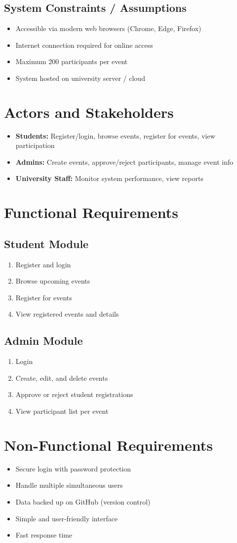 \documentclass[12pt,a4paper]{article}
\begin{document}
\subsection{System Constraints / Assumptions}
\begin{itemize}
    \item Accessible via modern web browsers (Chrome, Edge, Firefox)
    \item Internet connection required for online access
    \item Maximum 200 participants per event
    \item System hosted on university server / cloud
\end{itemize}

\section{Actors and Stakeholders}
\begin{itemize}
    \item \textbf{Students:} Register/login, browse events, register for events, view participation
    \item \textbf{Admins:} Create events, approve/reject participants, manage event info
    \item \textbf{University Staff:} Monitor system performance, view reports
\end{itemize}

\section{Functional Requirements}
\subsection{Student Module}
\begin{enumerate}
    \item Register and login
    \item Browse upcoming events
    \item Register for events
    \item View registered events and details
\end{enumerate}

\subsection{Admin Module}
\begin{enumerate}
    \item Login
    \item Create, edit, and delete events
    \item Approve or reject student registrations
    \item View participant list per event
\end{enumerate}

\section{Non-Functional Requirements}
\begin{itemize}
    \item Secure login with password protection
    \item Handle multiple simultaneous users
    \item Data backed up on GitHub (version control)
    \item Simple and user-friendly interface
    \item Fast response time
\end{itemize}
\end{document}
